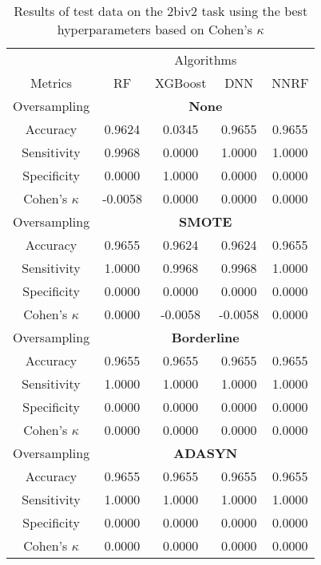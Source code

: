 \begin{table}[!htb]
\centering
\caption{Results of test data on the 2biv2 task using the best hyperparameters based on Cohen's $\kappa$}
\label{tab:{task}_test_results}
\begin{tabular}{c | c c c c}
\hline
 & \multicolumn{4}{c}{Algorithms}\\ 
Metrics &RF & XGBoost & DNN & NNRF\\ 
\hline
Oversampling &\multicolumn{4}{|c}{\textbf{None}}\\ 
\hline
Accuracy & 0.9624 & 0.0345 & 0.9655 & 0.9655\\ 
Sensitivity & 0.9968 & 0.0000 & 1.0000 & 1.0000\\ 
Specificity & 0.0000 & 1.0000 & 0.0000 & 0.0000\\ 
Cohen's $\kappa$ & -0.0058 & 0.0000 & 0.0000 & 0.0000\\ 
\hline
Oversampling &\multicolumn{4}{|c}{\textbf{SMOTE}}\\ 
\hline
Accuracy & 0.9655 & 0.9624 & 0.9624 & 0.9655\\ 
Sensitivity & 1.0000 & 0.9968 & 0.9968 & 1.0000\\ 
Specificity & 0.0000 & 0.0000 & 0.0000 & 0.0000\\ 
Cohen's $\kappa$ & 0.0000 & -0.0058 & -0.0058 & 0.0000\\ 
\hline
Oversampling &\multicolumn{4}{|c}{\textbf{Borderline}}\\ 
\hline
Accuracy & 0.9655 & 0.9655 & 0.9655 & 0.9655\\ 
Sensitivity & 1.0000 & 1.0000 & 1.0000 & 1.0000\\ 
Specificity & 0.0000 & 0.0000 & 0.0000 & 0.0000\\ 
Cohen's $\kappa$ & 0.0000 & 0.0000 & 0.0000 & 0.0000\\ 
\hline
Oversampling &\multicolumn{4}{|c}{\textbf{ADASYN}}\\ 
\hline
Accuracy & 0.9655 & 0.9655 & 0.9655 & 0.9655\\ 
Sensitivity & 1.0000 & 1.0000 & 1.0000 & 1.0000\\ 
Specificity & 0.0000 & 0.0000 & 0.0000 & 0.0000\\ 
Cohen's $\kappa$ & 0.0000 & 0.0000 & 0.0000 & 0.0000\\ 
\hline
\end{tabular}
\end{table}

